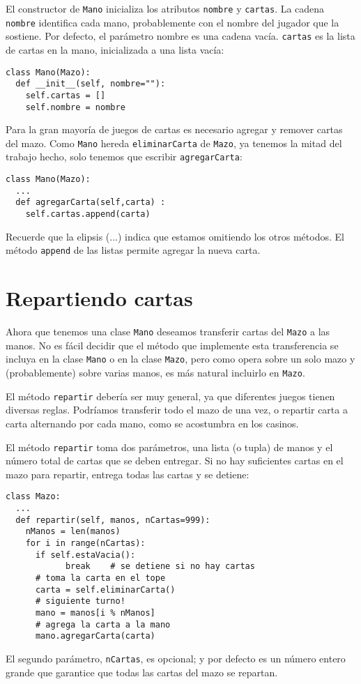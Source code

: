 El constructor de \texttt{Mano} inicializa los atributos 
 \texttt{nombre} y \texttt{cartas}.  La cadena \texttt{nombre}
identifica cada mano, probablemente con el nombre del jugador
que la sostiene. Por defecto, el parámetro nombre es una cadena
vacía. \texttt{cartas} es la lista de cartas en la mano,
inicializada a una lista vacía:

\beforeverb
\begin{verbatim}
class Mano(Mazo):
  def __init__(self, nombre=""):
    self.cartas = []
    self.nombre = nombre
\end{verbatim}
\afterverb
%
Para la gran mayoría de juegos de cartas es necesario agregar y
remover cartas del mazo. Como \texttt{Mano} hereda \texttt{eliminarCarta} de \texttt{Mazo}, ya tenemos la mitad del 
trabajo hecho, solo tenemos que escribir \texttt{agregarCarta}:

\beforeverb
\begin{verbatim}
class Mano(Mazo):
  ...
  def agregarCarta(self,carta) :
    self.cartas.append(carta)
\end{verbatim}
\afterverb
%
Recuerde que la elipsis (...) indica que estamos omitiendo los otros
métodos. El método  \texttt{append} de las listas permite
agregar la nueva carta.


\section{Repartiendo cartas}

Ahora que tenemos una clase \texttt{Mano} deseamos transferir
cartas del \texttt{Mazo} a las manos.  No es fácil decidir que
el método que implemente esta transferencia se incluya en la
clase  \texttt{Mano} o en la clase  \texttt{Mazo}, pero como
opera sobre un solo mazo y (probablemente) sobre varias manos,
es más natural incluirlo en  \texttt{Mazo}.

El método \texttt{repartir} debería ser muy general, ya que
diferentes juegos tienen diversas reglas. Podríamos transferir
todo el mazo de una vez, o repartir carta a carta alternando por 
cada mano, como se acostumbra en los casinos.
 
El método \texttt{repartir} toma dos parámetros, una lista (o tupla) de manos y  el número total de cartas que se deben entregar. Si no
hay suficientes cartas en el mazo para repartir, entrega todas las
cartas y se detiene:

\beforeverb
\begin{verbatim}
class Mazo:
  ...
  def repartir(self, manos, nCartas=999):
    nManos = len(manos)
    for i in range(nCartas):
      if self.estaVacia(): 
            break    # se detiene si no hay cartas
      # toma la carta en el tope
      carta = self.eliminarCarta() 
      # siguiente turno!
      mano = manos[i % nManos] 
      # agrega la carta a la mano
      mano.agregarCarta(carta) 
\end{verbatim}
\afterverb
%
El segundo parámetro, \texttt{nCartas}, es opcional; y por defecto
es un número entero grande que garantice que todas las cartas del
mazo se repartan.

